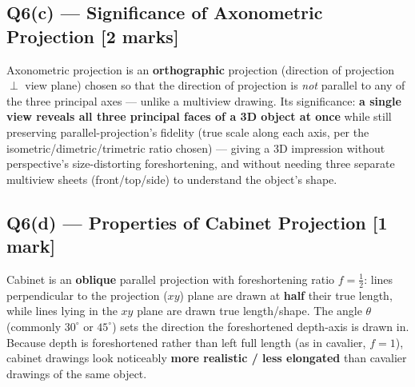\documentclass[12pt, a4paper]{article}
\newenvironment{answerbox}{\begin{mdframed}[style=answerframe]}{\end{mdframed}}
\begin{document}
\subsection*{Q6(c) --- Significance of Axonometric Projection [2 marks]}
\begin{answerbox}
Axonometric projection is an \textbf{orthographic} projection (direction of projection $\perp$ view plane) chosen so that the direction of projection is \emph{not} parallel to any of the three principal axes --- unlike a multiview drawing. Its significance: \textbf{a single view reveals all three principal faces of a 3D object at once} while still preserving parallel-projection's fidelity (true scale along each axis, per the isometric/dimetric/trimetric ratio chosen) --- giving a 3D impression without perspective's size-distorting foreshortening, and without needing three separate multiview sheets (front/top/side) to understand the object's shape.
\end{answerbox}

\subsection*{Q6(d) --- Properties of Cabinet Projection [1 mark]}
\begin{answerbox}
Cabinet is an \textbf{oblique} parallel projection with foreshortening ratio $f=\tfrac12$: lines perpendicular to the projection ($xy$) plane are drawn at \textbf{half} their true length, while lines lying in the $xy$ plane are drawn true length/shape. The angle $\theta$ (commonly $30^\circ$ or $45^\circ$) sets the direction the foreshortened depth-axis is drawn in. Because depth is foreshortened rather than left full length (as in cavalier, $f=1$), cabinet drawings look noticeably \textbf{more realistic / less elongated} than cavalier drawings of the same object.
\end{answerbox}
\end{document}
